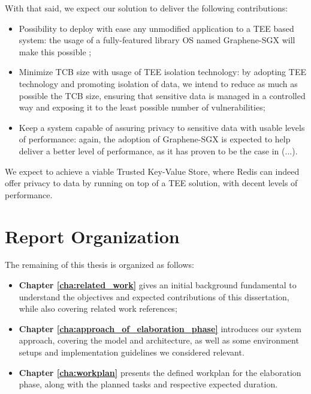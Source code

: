 With that said, we expect our solution to deliver the following contributions:
\begin{itemize}
	\item Possibility to deploy with ease any unmodified application to a TEE based system: 
	the usage of a fully-featured library OS named Graphene-SGX will make this possible \cite{graphenePaper};
	\item Minimize TCB size with usage of TEE isolation technology: by adopting TEE technology
	and promoting isolation of data, we intend to reduce as much as possible the TCB size,
	ensuring that sensitive data is managed in a controlled way and exposing it to the least possible number of vulnerabilities;
	\item Keep a system capable of assuring privacy to sensitive data with usable levels of performance:
	again, the adoption of Graphene-SGX is expected to help deliver a better level of performance, as it has proven to be the case in \cite{graphenePaper} (...).
\end{itemize}


We expect to achieve a viable Trusted Key-Value Store, where Redis can indeed
offer privacy to data by running on top of a TEE solution, with decent levels of performance.




\section{Report Organization}

The remaining of this thesis is organized as follows:
\begin{itemize}
	\item \textbf{Chapter \ref{cha:related_work}} gives an initial background fundamental to understand the objectives and expected contributions of this dissertation, while also covering related work references; 
	\item \textbf{Chapter \ref{cha:approach_of_elaboration_phase}} introduces our system approach, covering the model and architecture, as well as some environment setups and implementation guidelines we considered relevant.
	\item \textbf{Chapter \ref{cha:workplan}} presents the defined workplan for the elaboration phase, along with the planned tasks and respective expected duration.
\end{itemize}
